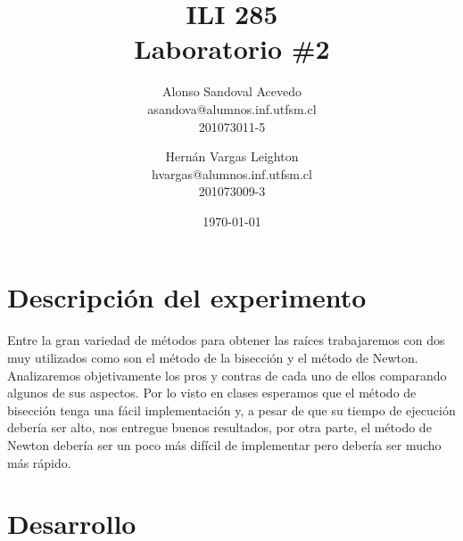 \documentclass[spanish, fleqn]{article}
\title{ILI 285 \\ Laboratorio \#2}
\author{Alonso Sandoval Acevedo\\asandova@alumnos.inf.utfsm.cl\\201073011-5 
		\and Hernán Vargas Leighton\\hvargas@alumnos.inf.utfsm.cl\\201073009-3}
\date{\today}
\begin{document}
\maketitle

\thispagestyle{empty}

\section{Descripción del experimento}
	Entre la gran variedad de métodos para obtener las raíces trabajaremos con
	dos muy utilizados como son el método de la bisección y el 	método de 
	Newton. Analizaremos objetivamente los pros y contras de cada	uno de
	ellos comparando algunos de sus aspectos. Por lo visto en clases esperamos
	que el método de bisección tenga una fácil implementación y, a pesar de
	que su tiempo de ejecución debería ser alto, nos entregue buenos
	resultados, por otra parte, el método de Newton debería ser un poco más
	difícil de implementar pero debería ser mucho más rápido.
\section{Desarrollo}
\end{document}

